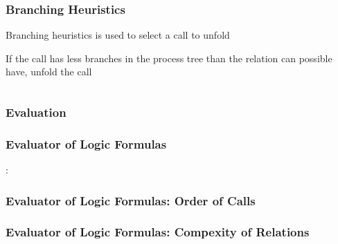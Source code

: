 \documentclass[xcolor=table]{beamer}
\newcommand{\rel}[2]{\texttt{#1}$^o$ #2}
\newcommand{\subst}[1]{$\langle$#1$\rangle$}
\begin{document}
\begin{frame}[fragile]
  \transwipe[direction=90]
  \frametitle{Branching Heuristics}

  \begin{center}
    Branching heuristics is used to select a call to unfold

    \vspace{0.5cm}

    If the call has less branches in the process tree than the relation can possible have, unfold the call
  \end{center}

\vspace{0.5cm}


  \begin{columns}
    \begin{column}[]{0.65\textwidth}
      \begin{center}
        
      \end{center}
    \end{column}
    \begin{column}[]{0.35\textwidth}
      \begin{center}
      \end{center}
    \end{column}
  \end{columns}
\end{frame}

\begin{frame}[fragile]
  \transwipe[direction=90]
  \frametitle{Evaluation}
\end{frame}

\begin{frame}[fragile]
  \transwipe[direction=90]
  \frametitle{Evaluator of Logic Formulas}
\end{frame}

\begin{frame}[fragile]
  \transwipe[direction=90]  :
  \frametitle{Evaluator of Logic Formulas: Order of Calls}
\end{frame}

\begin{frame}[fragile]
  \transwipe[direction=90]
  \frametitle{Evaluator of Logic Formulas: Compexity of Relations}
\end{frame}
\end{document}
